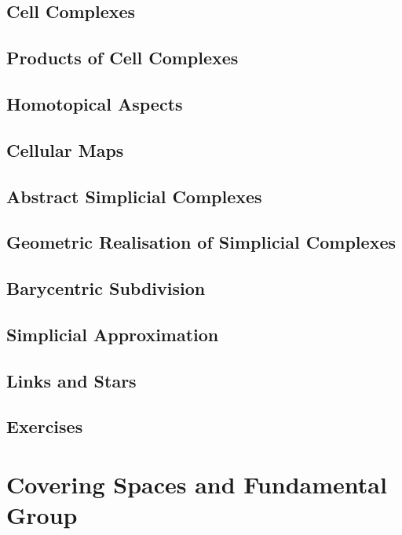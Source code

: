 \subsection{Cell Complexes}

\subsection{Products of Cell Complexes}

\subsection{Homotopical Aspects}

\subsection{Cellular Maps}

\subsection{Abstract Simplicial Complexes}

\subsection{Geometric Realisation of Simplicial Complexes}

\subsection{Barycentric Subdivision}

\subsection{Simplicial Approximation}

\subsection{Links and Stars}

\subsection{Exercises}

\section{Covering Spaces and Fundamental Group}

